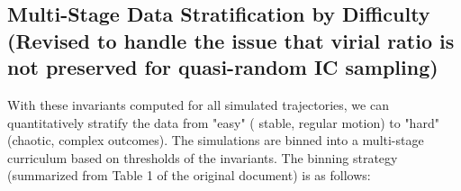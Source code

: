 \subsection{Multi-Stage Data Stratification by Difficulty (Revised to handle the issue that virial ratio is not preserved for quasi-random IC sampling)}


With these invariants computed for all simulated trajectories, we can quantitatively stratify the data from "easy" (
stable, regular motion) to "hard" (chaotic, complex outcomes).  The simulations are binned into a multi-stage curriculum 
based on thresholds of the invariants.  The binning strategy (summarized from Table 1 of the original document) is as follows:


